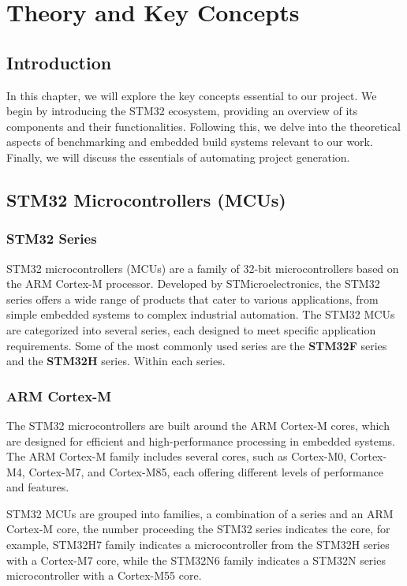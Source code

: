 \chapter{Theory and Key Concepts}

\section*{Introduction}
In this chapter, we will explore the key concepts essential to our project. We begin by introducing the STM32 ecosystem, providing an overview of its components and their functionalities. Following this, we delve into the theoretical aspects of benchmarking and embedded build systems relevant to our work. Finally, we will discuss the essentials of automating project generation.



\section{STM32 Microcontrollers (MCUs)}
\subsection{STM32 Series}
STM32 microcontrollers (MCUs) are a family of 32-bit microcontrollers based on the ARM Cortex-M processor. Developed by STMicroelectronics, the STM32 series offers a wide range of products that cater to various applications, from simple embedded systems to complex industrial automation.
The STM32 MCUs are categorized into several series, each designed to meet specific application requirements. Some of the most commonly used series are the \textbf{STM32F} series and the \textbf{STM32H} series. Within each series.
\subsection{ARM Cortex-M}
The STM32 microcontrollers are built around the ARM Cortex-M cores, which are designed for efficient and high-performance processing in embedded systems. 
The ARM Cortex-M family includes several cores, such as Cortex-M0, Cortex-M4, Cortex-M7, and Cortex-M85, each offering different levels of performance and features.

STM32 MCUs are grouped into families, a combination of a series and an ARM Cortex-M core, the number proceeding the STM32 series indicates the core, for example, STM32H7 family indicates a microcontroller from the STM32H series with a Cortex-M7 core, while the STM32N6 family indicates a STM32N series microcontroller with a Cortex-M55 core. 

